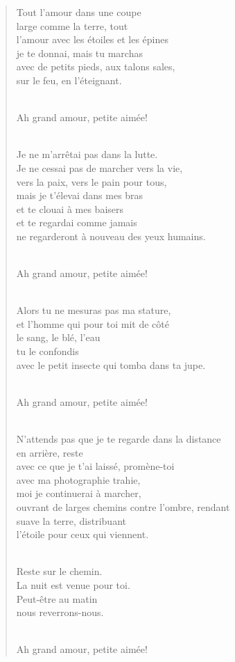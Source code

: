 \documentclass[11pt,a4paper]{book}
\begin{document}
\begin{verse}
Tout l'amour dans une coupe \\
large comme la terre, tout \\
l'amour avec les étoiles et les épines \\
je te donnai, mais tu marchas \\
avec de petits pieds, aux talons sales, \\
sur le feu, en l'éteignant. \\ \

Ah grand amour, petite aimée! \\ \

Je ne m'arrêtai pas dans la lutte. \\
Je ne cessai pas de marcher vers la vie, \\
vers la paix, vers le pain pour tous, \\
mais je t'élevai dans mes bras \\
et te clouai à mes baisers \\
et te regardai comme jamais \\
ne regarderont à nouveau des yeux humains. \\ \

Ah grand amour, petite aimée! \\ \

Alors tu ne mesuras pas ma stature, \\
et l'homme qui pour toi mit de côté \\
le sang, le blé, l'eau \\
tu le confondis \\
avec le petit insecte qui tomba dans ta jupe. \\ \

Ah grand amour, petite aimée! \\ \

N'attends pas que je te regarde dans la distance \\
en arrière, reste \\
avec ce que je t'ai laissé, promène-toi \\
avec ma photographie trahie, \\
moi je continuerai à marcher, \\
ouvrant de larges chemins contre l'ombre, rendant \\
suave la terre, distribuant \\
l'étoile pour ceux qui viennent. \\ \

Reste sur le chemin. \\
La nuit est venue pour toi. \\
Peut-être au matin \\
nous reverrons-nous. \\ \

Ah grand amour, petite aimée!
\end{verse}
\end{document}
